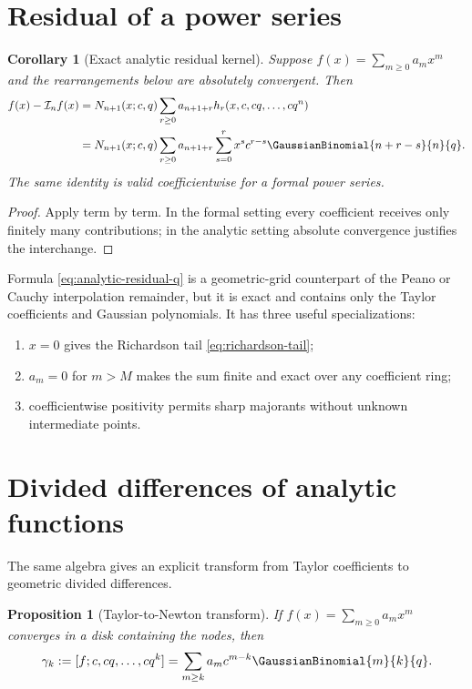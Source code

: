\documentclass[11pt,oneside]{book}
\numberwithin{equation}{chapter}
\newtheorem{proposition}[theorem]{Proposition}
\newtheorem{corollary}[theorem]{Corollary}
\theoremstyle{definition}
\theoremstyle{remark}
\newcommand{\Interp}{\mathcal I}
\begin{document}
\section{Residual of a power series}

\begin{corollary}[Exact analytic residual kernel]
\label{cor:analytic-residual}
Suppose $f(x)=\sum_{m\ge0}a_mx^m$ and the rearrangements below are absolutely
convergent.  Then
\begin{align}
 f(x)-\Interp_nf(x)
 &=N_{n+1}(x;c,q)
   \sum_{r\ge0}a_{n+1+r}h_r(x,c,cq,\ldots,cq^n)
 \label{eq:analytic-residual-h}\\
 &=N_{n+1}(x;c,q)
   \sum_{r\ge0}a_{n+1+r}
   \sum_{s=0}^rx^sc^{r-s}\GaussianBinomial{n+r-s}{n}{q}.
 \label{eq:analytic-residual-q}
\end{align}
The same identity is valid coefficientwise for a formal power series.
\end{corollary}

\begin{proof}
Apply  term by term.  In the formal setting every
coefficient receives only finitely many contributions; in the analytic
setting absolute convergence justifies the interchange.
\end{proof}

Formula \eqref{eq:analytic-residual-q} is a geometric-grid counterpart of the
Peano or Cauchy interpolation remainder, but it is exact and contains only
the Taylor coefficients and Gaussian polynomials.  It has three useful
specializations:
\begin{enumerate}
\item $x=0$ gives the Richardson tail \eqref{eq:richardson-tail};
\item $a_m=0$ for $m>M$ makes the sum finite and exact over any coefficient
      ring;
\item coefficientwise positivity permits sharp majorants without unknown
      intermediate points.
\end{enumerate}

\section{Divided differences of analytic functions}

The same algebra gives an explicit transform from Taylor coefficients to
geometric divided differences.

\begin{proposition}[Taylor-to-Newton transform]
\label{prop:taylor-newton-transform}
If $f(x)=\sum_{m\ge0}a_mx^m$ converges in a disk containing the nodes, then
\begin{equation}
 \gamma_k:=[f;c,cq,\ldots,cq^k]
 =\sum_{m\ge k}a_mc^{m-k}\GaussianBinomial{m}{k}{q}.
 \label{eq:taylor-to-newton}
\end{equation}
\end{proposition}
\end{document}
